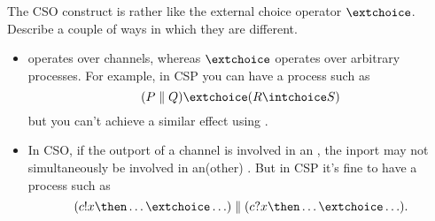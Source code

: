 \begin{question}
The CSO construct  is rather like the external choice operator
$\extchoice$.  Describe a couple of ways in which they are different.
\end{question}


\begin{answer}
\begin{itemize}
\item
{} operates over channels, whereas $\extchoice$ operates over
arbitrary processes.  For example, in CSP you can have a process such as
\[
(P \parallel Q) \extchoice (R \intchoice S)
\]
but you can't achieve a similar effect using . 

\item
In CSO, if the outport of a channel is involved in an , the inport
may not simultaneously be involved in an(other) .  But in CSP it's
fine to have a process such as
\[
(c!x \then \ldots \extchoice \ldots) \parallel (c?x \then \ldots \extchoice
\ldots). 
\]
\end{itemize}
\end{answer}
